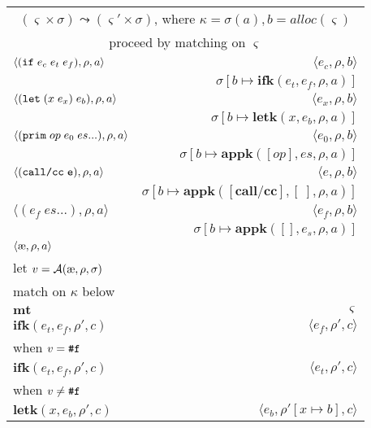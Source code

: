\documentclass[12pt,draft]{article}
\begin{document}
\begin{center}
\begin{tabular}{@{}l | r@{}}
\multicolumn{2}{c}{$(\varsigma \times \sigma) \leadsto (\varsigma' \times \sigma)$, 
where $\kappa = \sigma(a) , b = alloc(\varsigma) $} \\
\multicolumn{2}{c}{proceed by matching on $\varsigma$} \\
\hline\hline
$\langle
(\texttt{if}\;e_c\;e_t\;e_f) , \rho , a
\rangle$
&$\langle
e_c , \rho , b 
\rangle$ \\
& $\sigma[b \mapsto \textbf{ifk}(e_t , e_f , \rho , a)]$ \\
\hline
$\langle
(\texttt{let}\;(x\;e_x)\;e_b) , \rho , a
\rangle$
&$\langle
e_x , \rho , b
\rangle$ \\
& $\sigma[b \mapsto \textbf{letk}(x , e_b , \rho , a)]$ \\
\hline
$\langle
(\texttt{prim}\;op\;e_0\;es ...) , \rho , a
\rangle$
&$\langle
e_0 , \rho , b
\rangle$ \\
& $\sigma[b \mapsto \textbf{appk}([op] ,  es , \rho , a)]$ \\
\hline
$\langle
(\texttt{call/cc\;e}) , \rho , a
\rangle$
&$\langle
e , \rho , b
\rangle$ \\
&$\sigma[b \mapsto \textbf{appk}([\textbf{call/cc}] , [\;] , \rho , a)]$ \\
\hline
$\langle
(e_f \; es ...) , \rho , a
\rangle$
&$\langle
e_f , \rho , b
\rangle$ \\
& $\sigma[b \mapsto \textbf{appk}([] , e_s , \rho , a)]$ \\
\hline
$\langle \mae , \rho , a \rangle$ & \\
let $v = \mathcal{A}(\mae, \rho, \sigma)$ \\
match on $\kappa$ below \\
\hline
$ \textbf{mt}$ & $\varsigma$ \\
\hline
$ \textbf{ifk}(e_t , e_f , \rho' , c) $ 
& $\langle e_f , \rho' , c \rangle$ \\
when $v = \texttt{\#f}$ & \\
\hline
$ \textbf{ifk}(e_t , e_f , \rho' , c) $ 
& $\langle e_t , \rho' , c \rangle$ \\
when $v \not= \texttt{\#f}$ & \\
\hline
$ \textbf{letk}(x , e_b , \rho' , c) $
& $\langle e_b , \rho'[x \mapsto b] , c \rangle$ \\

\end{tabular}
\end{center}
\end{document}
